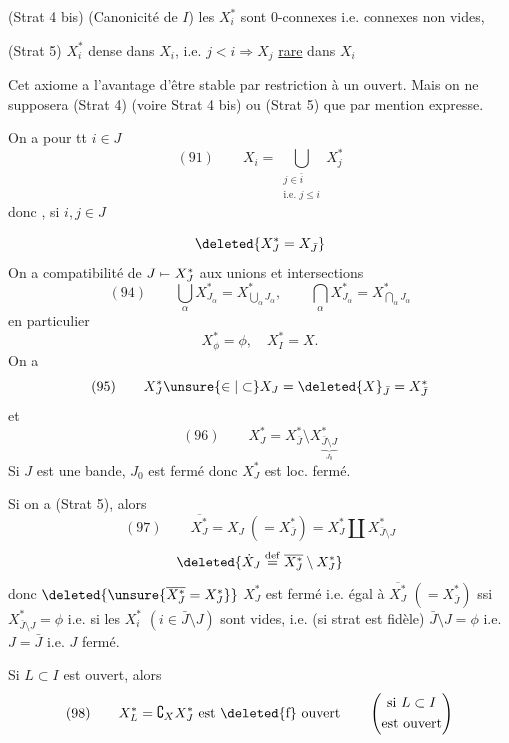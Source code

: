 (Strat 4 bis) (Canonicité de $I$) les $X_i^*$ sont $0$-connexes i.e. connexes non vides,

(Strat 5)  $X_i^*$ dense dans $X_i$,  i.e. $j<i\Rightarrow X_j$ \uline{rare} dans $X_i$

Cet axiome a l'avantage d'être stable par restriction à un ouvert. Mais on ne supposera (Strat 4) (voire Strat 4 bis) ou (Strat 5) que par mention expresse.

On a pour tt $i\in J$
\[
(91)\qquad X_i=\bigcup_{\substack{j\in\bar i\\\text{i.e. }j\leq i}}X_j^*
\]
donc , si $i,j\in J$


\[
\deleted{X_J^*=X_{\bar J}}
\]
On a compatibilité de $J\mathrel{\mapstochar\relbar}X_J^*$ aux unions et intersections
\[
(94)\qquad\bigcup_\alpha X_{J_\alpha}^*=X_{\bigcup_\alpha J_\alpha}^*,\qquad\bigcap_\alpha X_{J_\alpha}^*=X_{\bigcap_\alpha J_\alpha}^*
\]
en particulier
\[
X_\phi^*=\phi,\quad X_I^*=X.
\]
On a
\[
(95)\qquad X_J^*\unsure{\in|\subset}X_J=\deleted{X}_{\bar J}=X_{\bar J}^*
\]
et
\[
(96)\qquad X_J^*=X_{\bar J}^*\setminus X_{\underbrace{\bar J\setminus J}_{J_0}}^*
\]
Si $J$ est une bande, $J_0$ est fermé donc $X_J^*$ est loc. fermé.

Si on a (Strat 5), alors
\[
(97)\qquad\overline{X_J^*}=X_J\ (=X_{\bar J}^*)=X_J^*\amalg X_{\bar J\setminus J}^*
\]
\[
\deleted{\dot X_J\overset{\mathrm{def}}=\overline{X_J^*}\setminus X_J^*}
\]
donc $\deleted{\unsure{\overline{X_J^*}=X_J^*}}$ $X_J^*$ est fermé i.e. égal à $\overline{X_J^*}$ $(=X_{\bar J}^*)$ ssi $X_{\bar J\setminus J}^*=\phi$ i.e. si les $X_i^*$ $(i\in\bar J\setminus J)$ sont vides, i.e. (si strat est fidèle)  $\bar J\setminus J=\phi$ i.e. $J=\bar J$ i.e. $J$ fermé.

Si  $L\subset I$ est ouvert,  alors
\[
(98)\qquad X_L^*=\complement_X X_J^*\text{ est }\text{\deleted{f}}\text{ ouvert}\qquad\left(\begin{gathered}\text{si }L\subset I\\\text{est ouvert}\end{gathered}\right)
\]

